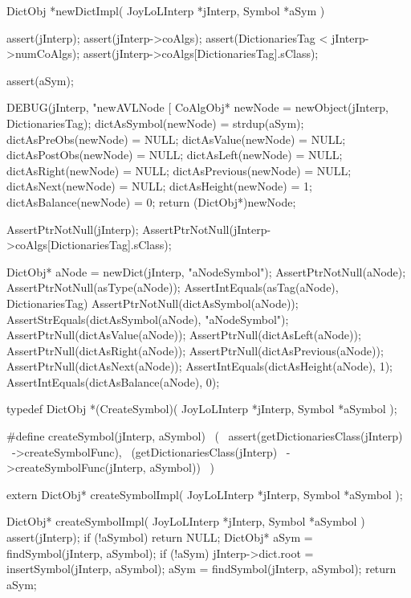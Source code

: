 DictObj *newDictImpl(
  JoyLoLInterp *jInterp,
  Symbol *aSym
) {
  assert(jInterp);
  assert(jInterp->coAlgs);
  assert(DictionariesTag < jInterp->numCoAlgs);
  assert(jInterp->coAlgs[DictionariesTag].sClass);
  
  assert(aSym);
  
  DEBUG(jInterp, "newAVLNode [%
  CoAlgObj* newNode   = newObject(jInterp, DictionariesTag);
  dictAsSymbol(newNode)   = strdup(aSym);
  dictAsPreObs(newNode)   = NULL;
  dictAsValue(newNode)    = NULL;
  dictAsPostObs(newNode)  = NULL;
  dictAsLeft(newNode)     = NULL;
  dictAsRight(newNode)    = NULL;
  dictAsPrevious(newNode) = NULL;
  dictAsNext(newNode)     = NULL;
  dictAsHeight(newNode)   = 1;
  dictAsBalance(newNode)  = 0;
  return (DictObj*)newNode;
}
\stopCCode


\startCTest
  AssertPtrNotNull(jInterp);
  AssertPtrNotNull(jInterp->coAlgs[DictionariesTag].sClass);

  DictObj* aNode = newDict(jInterp, "aNodeSymbol");
  AssertPtrNotNull(aNode);
  AssertPtrNotNull(asType(aNode));
  AssertIntEquals(asTag(aNode), DictionariesTag)
  AssertPtrNotNull(dictAsSymbol(aNode));
  AssertStrEquals(dictAsSymbol(aNode), "aNodeSymbol");
  AssertPtrNull(dictAsValue(aNode));
  AssertPtrNull(dictAsLeft(aNode));
  AssertPtrNull(dictAsRight(aNode));
  AssertPtrNull(dictAsPrevious(aNode));
  AssertPtrNull(dictAsNext(aNode));
  AssertIntEquals(dictAsHeight(aNode), 1);
  AssertIntEquals(dictAsBalance(aNode), 0);
\stopCTest
\stopTestCase
\stopTestSuite

\startTestSuite[createSymbol]

\startCHeader
typedef DictObj *(CreateSymbol)(
  JoyLoLInterp *jInterp,
  Symbol       *aSymbol
);

#define createSymbol(jInterp, aSymbol)      \
  (                                         \
    assert(getDictionariesClass(jInterp)    \
      ->createSymbolFunc),                  \
    (getDictionariesClass(jInterp)          \
      ->createSymbolFunc(jInterp, aSymbol)) \
  )
\stopCHeader

\setCHeaderStream{private}
\startCHeader
extern DictObj* createSymbolImpl(
  JoyLoLInterp *jInterp,
  Symbol       *aSymbol
);
\stopCHeader
{}

\startCCode
DictObj* createSymbolImpl(
  JoyLoLInterp *jInterp,
  Symbol       *aSymbol
) {
  assert(jInterp);
  if (!aSymbol) return NULL;
  DictObj* aSym = findSymbol(jInterp, aSymbol);
  if (!aSym) {
    jInterp->dict.root = insertSymbol(jInterp, aSymbol);
    aSym = findSymbol(jInterp, aSymbol);
  }
  return aSym;
}
\stopCCode
\stopTestSuite

